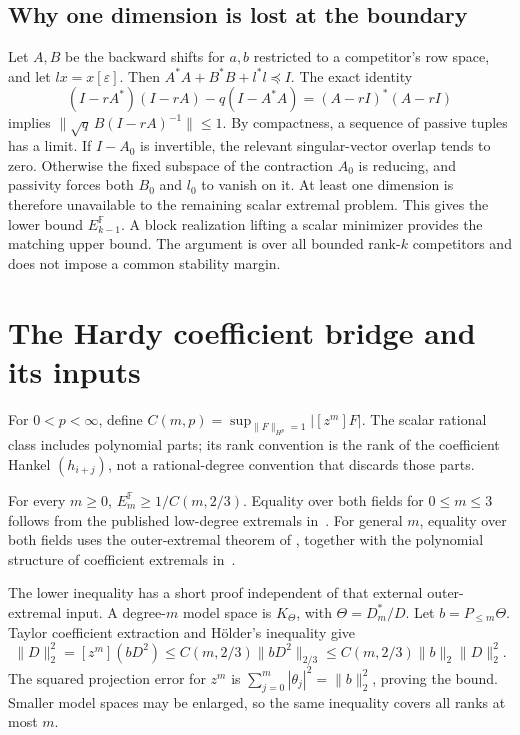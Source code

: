 \subsection{Why one dimension is lost at the boundary}
Let $A,B$ be the backward shifts for $a,b$ restricted to a competitor's
row space, and let $lx=x[\varepsilon]$. Then
$A^*A+B^*B+l^*l\preceq I$. The exact identity
\[
 (I-rA^*)(I-rA)-q(I-A^*A)=(A-rI)^*(A-rI)
\]
implies $\|\sqrt q\,B(I-rA)^{-1}\|\le1$. By compactness, a sequence
of passive tuples has a limit. If $I-A_0$ is invertible, the relevant
singular-vector overlap tends to zero. Otherwise the fixed subspace of
the contraction $A_0$ is reducing, and passivity forces both $B_0$ and
$l_0$ to vanish on it. At least one dimension is therefore unavailable
to the remaining scalar extremal problem. This gives the lower bound
$E_{k-1}^{\mathbb F}$. A block realization lifting a scalar minimizer
provides the matching upper bound. The argument is over all bounded
rank-$k$ competitors and does not impose a common stability margin.

\section{The Hardy coefficient bridge and its inputs}
For $0<p<\infty$, define
$C(m,p)=\sup_{\|F\|_{H^p}=1}|[z^m]F|$.
The scalar rational class includes polynomial parts; its rank convention
is the rank of the coefficient Hankel $(h_{i+j})$, not a rational-degree
convention that discards those parts.

\begin{theorem}
\label{I:I:main:hardy}
For every $m\ge0$, $E_m^{\mathbb F}\ge1/C(m,2/3)$.
Equality over both fields for $0\le m\le3$ follows from the published
low-degree extremals in~\citet{brevig2020}. For general $m$, equality
over both fields uses the outer-extremal theorem of
\citet{outer2026}, together with the polynomial structure of coefficient
extremals in~\citet{brevig2020}.
\end{theorem}

The lower inequality has a short proof independent of that external
outer-extremal input. A degree-$m$ model space is $K_\Theta$, with
$\Theta=D_m^*/D$. Let $b=P_{\le m}\Theta$. Taylor coefficient extraction
and H\"older's inequality give
\[
 \|D\|_2^2=[z^m](bD^2)
 \le C(m,2/3)\|bD^2\|_{2/3}
 \le C(m,2/3)\|b\|_2\|D\|_2^2.
\]
The squared projection error for $z^m$ is
$\sum_{j=0}^m|\theta_j|^2=\|b\|_2^2$, proving the bound. Smaller
model spaces may be enlarged, so the same inequality covers all ranks
at most $m$.

